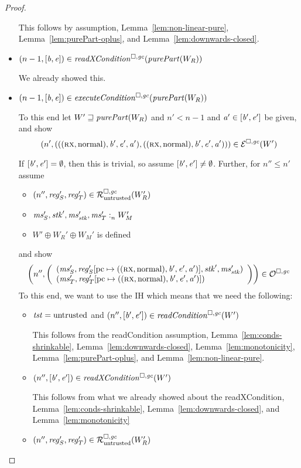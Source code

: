 \begin{proof}
\begin{itemize}
    This follows by assumption, Lemma~\ref{lem:non-linear-pure}, Lemma~\ref{lem:purePart-oplus}, and Lemma~\ref{lem:downwards-closed}.
  \item $\npair[n-1]{[\baddr,\eaddr]} \in \xReadCond{}(\purePart{W_R})$

    We already showed this.
  \item $\npair[n-1]{[\baddr,\eaddr]} \in \execCond{}(\purePart{W_R})$

    To this end let $W' \future \purePart{W_R}$ and $n' < n-1$ and $\aaddr' \in [\baddr',\eaddr']$ be given, and show
    \[
      \npair[n']{(((\rx,\normal),\baddr',\eaddr',\aaddr'),((\rx,\normal),\baddr',\eaddr',\aaddr'))} \in \lre(W')
    \]

    If $[\baddr',\eaddr'] = \emptyset$, then this is trivial, so assume $[\baddr',\eaddr'] \neq \emptyset$.
    Further, for $n'' \leq n'$ assume
    \begin{itemize}
    \item $\npair[n'']{\reg_S',\reg_T'} \in \lrr(W_R')$
    \item $\memSat{\ms_S',\stk',\ms_\stk',\ms_T'}{W_M'}$
    \item $W' \oplus W_R' \oplus W_M'$ is defined
    \end{itemize}
    and show
    \[
      \npair[n'']{\left(
          \begin{array}{l}
          (\ms_S',\reg_S'\update{\pcreg}{((\rx,\normal),\baddr',\eaddr',\aaddr')},\stk',\ms_\stk') \\
          (\ms_T',\reg_T'\update{\pcreg}{((\rx,\normal),\baddr',\eaddr',\aaddr')})
          \end{array}
         \right)} \in \lro
    \]
    To this end, we want to use the IH which means that we need the following:
    \begin{itemize}
    \item $\trust = \untrusted$ and $\npair[n'']{[\baddr',\eaddr']} \in \readCond{W'}$

      This follows from the readCondition assumption, Lemma~\ref{lem:conds-shrinkable}, Lemma~\ref{lem:downwards-closed}, Lemma~\ref{lem:monotonicity}, Lemma~\ref{lem:purePart-oplus}, and Lemma~\ref{lem:non-linear-pure}.
    \item $\npair[n'']{[\baddr',\eaddr']} \in \xReadCond{W'}$

      This follows from what we already showed about the readXCondition,
      Lemma~\ref{lem:conds-shrinkable}, Lemma~\ref{lem:downwards-closed}, and Lemma~\ref{lem:monotonicity}
    \item $\npair[n'']{\reg_S',\reg_T'} \in \lrr(W_R')$


\end{itemize}
\end{itemize}
\end{proof}
